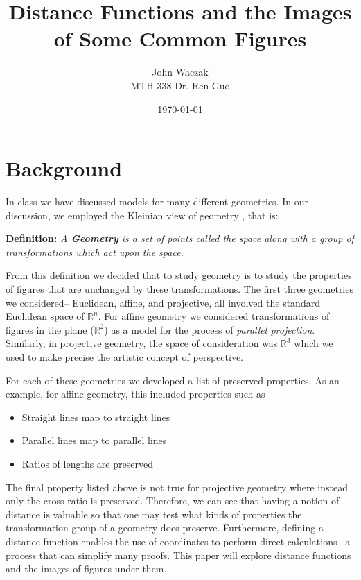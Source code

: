 \documentclass[a4paper, 12pt]{article}
\title{Distance Functions and the Images of Some Common Figures}
\date{\today}
\author{John Waczak\\MTH 338 \hspace{1em} Dr. Ren Guo}
\newcommand{\definition}[1]{
  \begin{minipage}[c]{0.85\textwidth}
    \vspace{2 em}
    \textbf{Definition:} \textit{#1}
    \vspace{2 em}
  \end{minipage}
}
\newcommand{\R}{\mathbb{R}}
\begin{document}
\maketitle


\section*{Background}

In class we have discussed models for many different geometries. In our discussion, we employed the Kleinian view of geometry \cite{brannan}, that is:

\definition{A \textbf{Geometry} is a set of points called the \textit{space} along with a group of transformations which act upon the space. }

\noindent From this definition we decided that to study geometry is to study the properties of figures that are unchanged by these transformations. The first three geometries we considered-- Euclidean, affine, and projective, all involved the standard Euclidean space of $\R^n$. For affine geometry we considered transformations of figures in the plane ($\R^2$) as a model for the process of \textit{parallel projection}. Similarly, in projective geometry, the space of consideration was $\R^3$ which we used to make precise the artistic concept of perspective.

For each of these geometries we developed a list of preserved properties. As an example, for affine geometry, this included properties such as
\begin{itemize}
\item Straight lines map to straight lines
\item Parallel lines map to parallel lines 
\item Ratios of lengths are preserved
\end{itemize}

The final property listed above is not true for projective geometry where instead only the cross-ratio is preserved. Therefore, we can see that having a notion of distance is valuable so that one may test what kinds of properties the transformation group of a geometry does preserve. Furthermore, defining a distance function enables the use of coordinates to perform direct calculations-- a process that can simplify many proofs. This paper will explore distance functions and the images of figures under them.  
\end{document}
